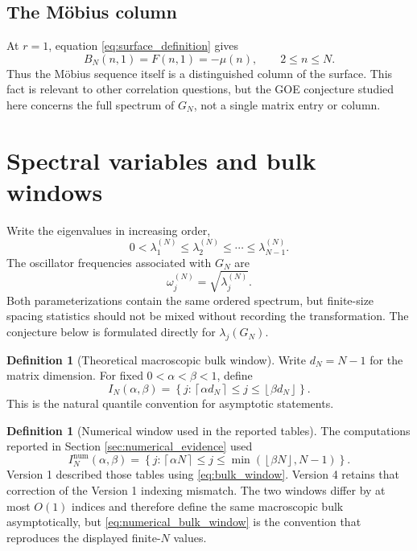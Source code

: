 \documentclass[11pt]{amsart}
\numberwithin{equation}{section}
\theoremstyle{plain}
\theoremstyle{definition}
\newtheorem{definition}[theorem]{Definition}
\theoremstyle{remark}
\newcommand{\mob}{\mu}
\begin{document}
\subsection{The M\"obius column}
\label{subsec:mobius_column}

At $r=1$, equation \eqref{eq:surface_definition} gives
\begin{equation}
B_N(n,1)=F(n,1)=-\mob(n),
\qquad 2\le n\le N.
\label{eq:first_column_mobius}
\end{equation}
Thus the M\"obius sequence itself is a distinguished column of the surface.  This fact is relevant to other correlation questions, but the GOE conjecture studied here concerns the full spectrum of $G_N$, not a single matrix entry or column.

\section{Spectral variables and bulk windows}
\label{sec:spectral_variables}

Write the eigenvalues in increasing order,
\begin{equation}
0<\lambda_1^{(N)}\le\lambda_2^{(N)}\le\cdots\le\lambda_{N-1}^{(N)}.
\label{eq:eigenvalue_order}
\end{equation}
The oscillator frequencies associated with $G_N$ are
\begin{equation}
\omega_j^{(N)}=\sqrt{\lambda_j^{(N)}}.
\label{eq:oscillator_frequency}
\end{equation}
Both parameterizations contain the same ordered spectrum, but finite-size spacing statistics should not be mixed without recording the transformation.  The conjecture below is formulated directly for $\lambda_j(G_N)$.

\begin{definition}[Theoretical macroscopic bulk window]
\label{def:bulk_window}
Write $d_N=N-1$ for the matrix dimension.  For fixed $0<\alpha<\beta<1$, define
\begin{equation}
I_N(\alpha,\beta)
=
\left\{j:\left\lceil\alpha d_N\right\rceil
\le j\le
\left\lfloor\beta d_N\right\rfloor\right\}.
\label{eq:bulk_window}
\end{equation}
This is the natural quantile convention for asymptotic statements.
\end{definition}

\begin{definition}[Numerical window used in the reported tables]
\label{def:numerical_bulk_window}
The computations reported in Section \ref{sec:numerical_evidence} used
\begin{equation}
I_N^{\mathrm{num}}(\alpha,\beta)
=
\left\{j:\left\lceil\alpha N\right\rceil
\le j\le
\min\!\left(\left\lfloor\beta N\right\rfloor,N-1\right)\right\}.
\label{eq:numerical_bulk_window}
\end{equation}
Version 1 described those tables using \eqref{eq:bulk_window}.  Version 4 retains that correction of the Version 1 indexing mismatch.  The two windows differ by at most $O(1)$ indices and therefore define the same macroscopic bulk asymptotically, but \eqref{eq:numerical_bulk_window} is the convention that reproduces the displayed finite-$N$ values.
\end{definition}
\end{document}
